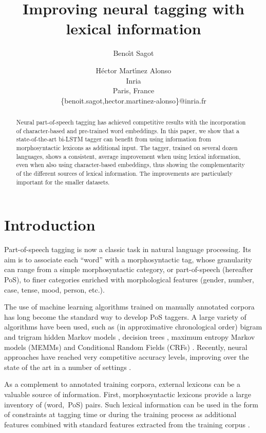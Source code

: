 \documentclass[11pt,a4paper]{article}
\title{Improving neural tagging with lexical information}
\author{Beno\^{\i}t Sagot \and H\'ector Mart\'{\i}nez Alonso \\
         Inria\\
       Paris, France\\
\{benoit.sagot,hector.martinez-alonso\}@inria.fr}
\date{}
\begin{document}
\maketitle
\begin{abstract}
  Neural part-of-speech tagging has achieved competitive results with the incorporation of character-based and
  pre-trained word embeddings. In this paper, we show that a state-of-the-art bi-LSTM tagger can benefit from using
  information from morphosyntactic lexicons as additional input. The tagger, trained on several dozen languages, shows a
  consistent, average improvement when using lexical information, even when also using character-based embeddings, thus
  showing the complementarity of the different sources of lexical information. The improvements are particularly
  important for the smaller datasets.
\end{abstract}


\section{Introduction}

Part-of-speech tagging is now a classic task in natural language processing. Its aim is to associate each ``word'' with
a morphosyntactic tag, whose granularity can range from a simple morphosyntactic category, or part-of-speech (hereafter
PoS), to finer categories enriched with morphological features (gender, number, case, tense, mood, person, etc.).

The use of machine learning algorithms trained on manually annotated corpora has long become the standard way to develop
PoS taggers. A large variety of algorithms have been used, such as (in approximative chronological order) bigram and
trigram hidden Markov models \cite{merialdo94,brants96,brants00}, decision trees \cite{schmid94,magerman95}, maximum
entropy Markov models (MEMMs) \cite{ratnaparkhi96} and Conditional Random Fields (CRFs)
\cite{lafferty01,constant12}. Recently, neural approaches have reached very competitive accuracy levels, improving over
the state of the art in a number of settings \cite{plank16}.

As a complement to  annotated training corpora, external lexicons can be a valuable source of information.
First, morphosyntactic lexicons provide a large inventory of (word,~PoS)
pairs. Such lexical information can be used in the form of constraints at tagging time \cite{kim99,hajic00tagging} or
during the training process as additional features combined with standard features extracted from the training corpus
\cite{chrupala08,goldberg09,denis12}.
\end{document}
